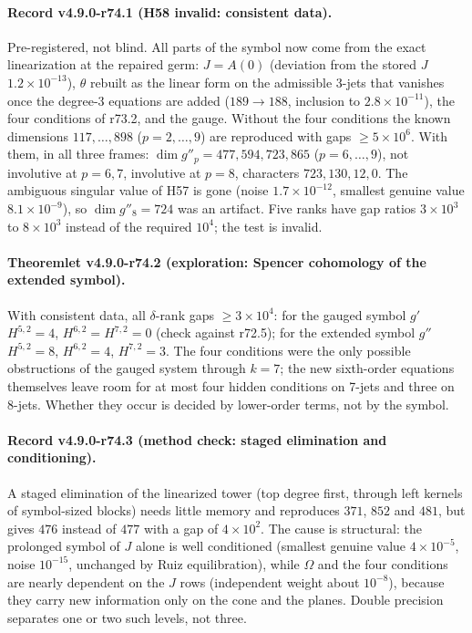 \paragraph{Record v4.9.0-r74.1 (H58 invalid: consistent data).}
Pre-registered, not blind.  All parts of the symbol now come from the exact linearization at the repaired germ: \(J=A(0)\)
(deviation from the stored \(J\) \(1.2\times10^{-13}\)), \(\theta\) rebuilt as the linear form on the admissible 3-jets that
vanishes once the degree-3 equations are added (\(189\to188\), inclusion to \(2.8\times10^{-11}\)), the four conditions of
r73.2, and the gauge.  Without the four conditions the known dimensions \(117,\dots,898\) (\(p=2,\dots,9\)) are reproduced
with gaps \(\ge5\times10^6\).  With them, in all three frames: \(\dim g''_p=477,594,723,865\) (\(p=6,\dots,9\)), not
involutive at \(p=6,7\), involutive at \(p=8\), characters \(723,130,12,0\).  The ambiguous singular value of H57 is gone
(noise \(1.7\times10^{-12}\), smallest genuine value \(8.1\times10^{-9}\)), so \(\dim g''_8=724\) was an artifact.  Five ranks
have gap ratios \(3\times10^3\) to \(8\times10^3\) instead of the required \(10^4\); the test is invalid.

\paragraph{Theoremlet v4.9.0-r74.2 (exploration: Spencer cohomology of the extended symbol).}
With consistent data, all \(\delta\)-rank gaps \(\ge3\times10^4\): for the gauged symbol \(g'\)
\(H^{5,2}=4\), \(H^{6,2}=H^{7,2}=0\) (check against r72.5); for the extended symbol \(g''\) \(H^{5,2}=8\), \(H^{6,2}=4\),
\(H^{7,2}=3\).  The four conditions were the only possible obstructions of the gauged system through \(k=7\); the new
sixth-order equations themselves leave room for at most four hidden conditions on 7-jets and three on 8-jets.  Whether they
occur is decided by lower-order terms, not by the symbol.

\paragraph{Record v4.9.0-r74.3 (method check: staged elimination and conditioning).}
A staged elimination of the linearized tower (top degree first, through left kernels of symbol-sized blocks) needs little
memory and reproduces \(371\), \(852\) and \(481\), but gives \(476\) instead of \(477\) with a gap of \(4\times10^2\).  The cause
is structural: the prolonged symbol of \(J\) alone is well conditioned (smallest genuine value \(4\times10^{-5}\), noise
\(10^{-15}\), unchanged by Ruiz equilibration), while \(\Omega\) and the four conditions are nearly dependent on the \(J\) rows
(independent weight about \(10^{-8}\)), because they carry new information only on the cone and the planes.  Double
precision separates one or two such levels, not three.

